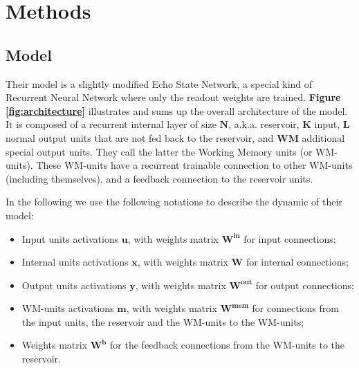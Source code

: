 \section{Methods}
\label{s:method}

\subsection{Model}
\label{s:model}

Their model is a slightly modified Echo State Network, a special kind of Recurrent Neural Network where only the readout weights are trained.
\textbf{Figure \ref{fig:architecture}} illustrates and sums up the overall architecture of the model.
It is composed of a recurrent internal layer of size $\mathbf{N}$, a.k.a. reservoir, $\mathbf{K}$ input, $\mathbf{L}$ normal output units that are not fed back to the reservoir, and $\mathbf{WM}$ additional special output units.
They call the latter the Working Memory units (or WM-units).
These WM-units have a recurrent trainable connection to other WM-units (including themselves), and a feedback connection to the reservoir units.

In the following we use the following notations to describe the dynamic of their model:
\begin{itemize}
    \item Input units activations $\mathbf{u}$, with weights matrix $\mathbf{W^{in}}$ for input connections;
    \item Internal units activations $\mathbf{x}$, with weights matrix $\mathbf{W}$ for internal connections;
    \item Output units activations $\mathbf{y}$, with weights matrix $\mathbf{W^{out}}$ for output connections;
    \item WM-units activations $\mathbf{m}$, with weights matrix $\mathbf{W^{mem}}$ for connections from the input units, the reservoir and the WM-units to the WM-units;
    \item Weights matrix $\mathbf{W^{b}}$ for the feedback connections from the WM-units to the reservoir.
\end{itemize}

